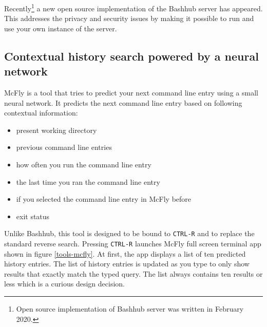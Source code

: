Recently\footnote{Open source implementation of Bashhub server was written in February 2020.} a new open source implementation\cite{toolsbashhubserver} of the Bashhub server has appeared. This addresses the privacy and security issues by making it possible to run and use your own instance of the server.





\subsection{Contextual history search powered by a neural network}

McFly\cite{toolsmcfly} is a tool that tries to predict your next command line entry using a small neural network. It predicts the next command line entry based on following contextual information:
\begin{itemize}
    \item present working directory
    \item previous command line entries
    \item how often you run the command line entry
    \item the last time you ran the command line entry
    \item if you selected the command line entry in McFly before
    \item exit status
\end{itemize}

Unlike Bashhub, this tool is designed to be bound to \verb|CTRL-R| and to replace the standard reverse search. Pressing \verb|CTRL-R| launches McFly full screen terminal app shown in figure \ref{tools-mcfly}. At first, the app displays a list of ten predicted history entries. The list of history entries is updated as you type to only show results that exactly match the typed query. The list always contains ten results or less which is a curious design decision. 


